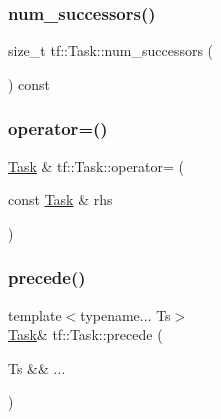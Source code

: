 \mbox{\label{classtf_1_1Task_a1a0afc89e8a6a416c511e74d82df135d}} 
\subsubsection{\texorpdfstring{num\+\_\+successors()}{num\_successors()}}
{\footnotesize\ttfamily size\+\_\+t tf\+::\+Task\+::num\+\_\+successors (\begin{DoxyParamCaption}{ }\end{DoxyParamCaption}) const\hspace{0.3cm}{\ttfamily [inline]}}

\mbox{\label{classtf_1_1Task_aebdcc47e47a119f261daab673a971458}} 
\subsubsection{\texorpdfstring{operator=()}{operator=()}}
{\footnotesize\ttfamily \hyperlink{classtf_1_1Task}{Task} \& tf\+::\+Task\+::operator= (\begin{DoxyParamCaption}\item[{const \hyperlink{classtf_1_1Task}{Task} \&}]{rhs }\end{DoxyParamCaption})\hspace{0.3cm}{\ttfamily [inline]}}

\mbox{\label{classtf_1_1Task_a119a34cce8c92e359f8ed31f2610d0ff}} 
\subsubsection{\texorpdfstring{precede()}{precede()}\hspace{0.1cm}{\footnotesize\ttfamily [1/2]}}
{\footnotesize\ttfamily template$<$typename... Ts$>$ \\
\hyperlink{classtf_1_1Task}{Task}\& tf\+::\+Task\+::precede (\begin{DoxyParamCaption}\item[{Ts \&\&}]{... }\end{DoxyParamCaption})}

